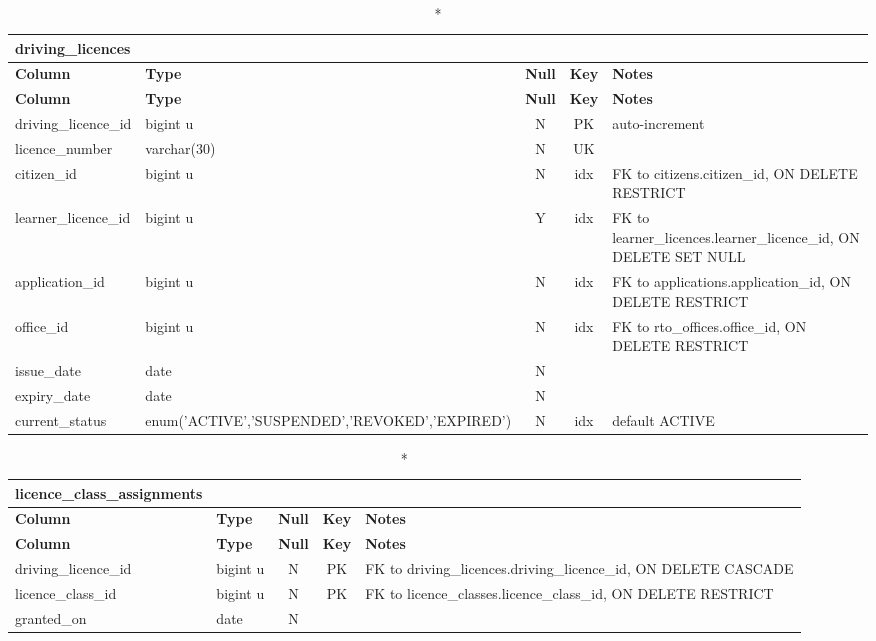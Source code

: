 \vspace{-0.4em}
\begin{longtable}{@{}p{3.4cm}p{2.9cm}c c p{5.6cm}@{}}
\caption*{\textbf{driving\_\allowbreak{}licences}}\\
\toprule \textbf{Column} & \textbf{Type} & \textbf{Null} & \textbf{Key} & \textbf{Notes} \\ \midrule \endfirsthead
\toprule \textbf{Column} & \textbf{Type} & \textbf{Null} & \textbf{Key} & \textbf{Notes} \\ \midrule \endhead
\bottomrule \endlastfoot
driving\_\allowbreak{}licence\_\allowbreak{}id & bigint u & N & PK & auto-increment \\
licence\_\allowbreak{}number & varchar(30) & N & UK &  \\
citizen\_\allowbreak{}id & bigint u & N & idx & FK to citizens.citizen\_\allowbreak{}id, ON DELETE RESTRICT \\
learner\_\allowbreak{}licence\_\allowbreak{}id & bigint u & Y & idx & FK to learner\_\allowbreak{}licences.learner\_\allowbreak{}licence\_\allowbreak{}id, ON DELETE SET NULL \\
application\_\allowbreak{}id & bigint u & N & idx & FK to applications.application\_\allowbreak{}id, ON DELETE RESTRICT \\
office\_\allowbreak{}id & bigint u & N & idx & FK to rto\_\allowbreak{}offices.office\_\allowbreak{}id, ON DELETE RESTRICT \\
issue\_\allowbreak{}date & date & N &  &  \\
expiry\_\allowbreak{}date & date & N &  &  \\
current\_\allowbreak{}status & enum('ACTIVE',\allowbreak{}'SUSPENDED',\allowbreak{}'REVOKED',\allowbreak{}'EXPIRED') & N & idx & default ACTIVE \\
\end{longtable}
\vspace{-0.4em}
\begin{longtable}{@{}p{3.4cm}p{2.9cm}c c p{5.6cm}@{}}
\caption*{\textbf{licence\_\allowbreak{}class\_\allowbreak{}assignments}}\\
\toprule \textbf{Column} & \textbf{Type} & \textbf{Null} & \textbf{Key} & \textbf{Notes} \\ \midrule \endfirsthead
\toprule \textbf{Column} & \textbf{Type} & \textbf{Null} & \textbf{Key} & \textbf{Notes} \\ \midrule \endhead
\bottomrule \endlastfoot
driving\_\allowbreak{}licence\_\allowbreak{}id & bigint u & N & PK & FK to driving\_\allowbreak{}licences.driving\_\allowbreak{}licence\_\allowbreak{}id, ON DELETE CASCADE \\
licence\_\allowbreak{}class\_\allowbreak{}id & bigint u & N & PK & FK to licence\_\allowbreak{}classes.licence\_\allowbreak{}class\_\allowbreak{}id, ON DELETE RESTRICT \\
granted\_\allowbreak{}on & date & N &  &  \\
\end{longtable}
